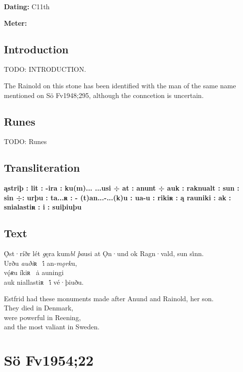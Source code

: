 \begin{flushright}%
\textbf{Dating:} C11th

\textbf{Meter:} \Fornyrdislag
\end{flushright}%

\subsection{Introduction}

TODO: INTRODUCTION.

The Rainold on this stone has been identified with the man of the same name mentioned on Sö Fv1948;295, although the conncetion is uncertain.

\subsection{Runes}

TODO: Runes%

\subsection{Transliteration}

\textbf{ąstriþ : lit : -ira : ku(m)... ...usi ÷ at : anunt ÷ auk : raknualt : sun : sin ÷: urþu : ta...ʀ : - (t)an...-...(k)u : ua-u : rikiʀ : ą rauniki : ak : snialastiʀ : i : suiþiuþu}

\subsection{Text}

\bpg\bpa[0]%
\startsub Ǫ̇st·ríðr lét \emph{g}ęra kum\emph{bl þa}usi at Ǫn·und ok Ragn·vald, sun si̇nn.\endsub \\
Urðu \emph{auði}ʀ \hld\ i̇́ an-\emph{mǫrk}u, \\
vǫ́\emph{ʀ}u íkiʀ \hld\ ȧ auningi \\
auk niallastiʀ \hld\ i̇́ vé·þiuðu. \epa

\bpb Estfrid had these monuments made after Anund and Rainold, her son. \\
They died in Denmark, \\
were powerful in Reening, \\
and the most valiant in Sweden.\epb\epg

\sectionline\clearpage


\section{Sö Fv1954;22}

